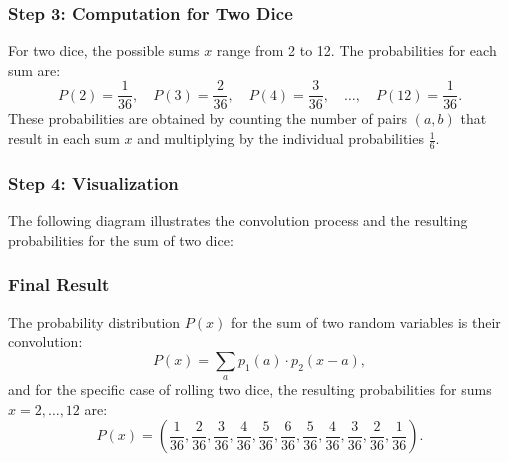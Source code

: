 \documentclass[12pt]{article}
\begin{document}
\subsubsection*{Step 3: Computation for Two Dice}
For two dice, the possible sums \( x \) range from 2 to 12. The probabilities for each sum are:
\[
P(2) = \frac{1}{36}, \quad P(3) = \frac{2}{36}, \quad P(4) = \frac{3}{36}, \quad \dots, \quad P(12) = \frac{1}{36}.
\]
These probabilities are obtained by counting the number of pairs \( (a, b) \) that result in each sum \( x \) and multiplying by the individual probabilities \( \frac{1}{6} \).

\subsubsection*{Step 4: Visualization}
The following diagram illustrates the convolution process and the resulting probabilities for the sum of two dice:

\begin{center}
\end{center}

\subsubsection*{Final Result}
The probability distribution \( P(x) \) for the sum of two random variables is their convolution:
\[
P(x) = \sum_{a} p_1(a) \cdot p_2(x - a),
\]
and for the specific case of rolling two dice, the resulting probabilities for sums \( x = 2, \dots, 12 \) are:
\[
P(x) = \left( \frac{1}{36}, \frac{2}{36}, \frac{3}{36}, \frac{4}{36}, \frac{5}{36}, \frac{6}{36}, \frac{5}{36}, \frac{4}{36}, \frac{3}{36}, \frac{2}{36}, \frac{1}{36} \right).
\]
\end{document}
